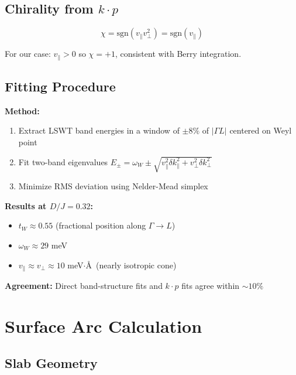 \documentclass[11pt,letterpaper]{article}
\begin{document}
\subsection{Chirality from $k \cdot p$}

\begin{equation}
\chi = \text{sgn}(v_\parallel v_\perp^2) = \text{sgn}(v_\parallel)
\end{equation}

For our case: $v_\parallel > 0$ so $\chi = +1$, consistent with Berry integration.

\subsection{Fitting Procedure}

\begin{derivation}[title={$k \cdot p$ Parameter Extraction}]
\textbf{Method:}
\begin{enumerate}
    \item Extract LSWT band energies in a window of $\pm 8\%$ of $|\Gamma L|$ centered on Weyl point
    \item Fit two-band eigenvalues $E_\pm = \omega_W \pm \sqrt{v_\parallel^2 \delta k_\parallel^2 + v_\perp^2 \delta k_\perp^2}$
    \item Minimize RMS deviation using Nelder-Mead simplex
\end{enumerate}

\textbf{Results at $D/J = 0.32$:}
\begin{itemize}
    \item $t_W \approx 0.55$ (fractional position along $\Gamma \to L$)
    \item $\omega_W \approx 29$ meV
    \item $v_\parallel \approx v_\perp \approx 10$ meV$\cdot$\AA\ (nearly isotropic cone)
\end{itemize}

\textbf{Agreement:} Direct band-structure fits and $k \cdot p$ fits agree within $\sim 10\%$
\end{derivation}

\section{Surface Arc Calculation}

\subsection{Slab Geometry}
\end{document}
